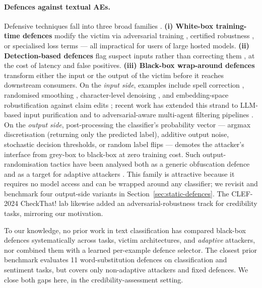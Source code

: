 \documentclass[11pt]{article}
\begin{document}
\paragraph{Defences against textual AEs.}
Defensive techniques fall into three broad families \citep{Goyal2023survey, Qiu2022survey}.
\textbf{(i) White-box training-time defences} modify the victim via adversarial training \citep{Madry2018, Miyato2017advtrain}, certified robustness \citep{Jia2019cert, Ye2020safer}, or specialised loss terms \citep{Zhu2020freelb} --- all impractical for users of large hosted models.
\textbf{(ii) Detection-based defences} flag suspect inputs rather than correcting them \citep{Mozes2021fgws, Zhou2019disp}, at the cost of latency and false positives.
\textbf{(iii) Black-box wrap-around defences} transform either the input or the output of the victim before it reaches downstream consumers. On the \emph{input side}, examples include spell correction \citep{Pruthi2019combating}, randomised smoothing \citep{Ye2020safer}, character-level denoising \citep{Jones2020robenc}, and embedding-space robustification against claim edits \citep{Magomere2025claimrobust}; recent work has extended this strand to LLM-based input purification \citep{Moraffah2024purification, Robey2023smoothllm} and to adversarial-aware multi-agent filtering pipelines \citep{Aldahoul2025multiagent, Tong2025groupadaptive}. On the \emph{output side}, post-processing the classifier's probability vector --- argmax discretisation (returning only the predicted label), additive output noise, stochastic decision thresholds, or random label flips --- demotes the attacker's interface from grey-box to black-box at zero training cost. Such output-randomisation tactics have been analysed both as a generic obfuscation defence and as a target for adaptive attackers \citep{Tramer2020, Athalye2018}. This family is attractive because it requires no model access and can be wrapped around any classifier; we revisit and benchmark four output-side variants in Section~\ref{sec:static-defences}. The CLEF-2024 CheckThat! lab \citep{Barron2024checkthat} likewise added an adversarial-robustness track for credibility tasks, mirroring our motivation.

To our knowledge, no prior work in text classification has compared black-box defences systematically across tasks, victim architectures, and \emph{adaptive} attackers, nor combined them with a learned per-example defence selector. The closest prior benchmark \citep{Li2021defender} evaluates 11 word-substitution defences on classification and sentiment tasks, but covers only non-adaptive attackers and fixed defences. We close both gaps here, in the credibility-assessment setting.
\end{document}

